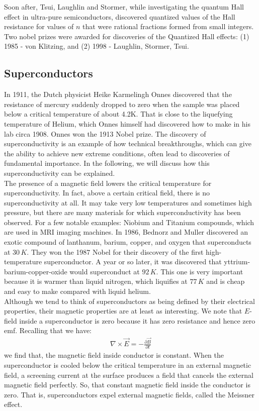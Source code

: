 \documentclass[11pt]{article}
\theoremstyle{break}
\theoremstyle{break}
\newcommand{\pd}{\partial}
\begin{document}
Soon after, Tsui, Laughlin and Stormer, while investigating the quantum Hall effect in ultra-pure semiconductors, discovered quantized values of the Hall resistance for values of $n$ that were rational fractions formed from small integers. \\

Two nobel prizes were awarded for discoveries of the Quantized Hall effects: (1) 1985 - von Klitzing, and (2) 1998 - Laughlin, Stormer, Tsui.



\subsection{Superconductors}
In 1911, the Dutch physicist Heike Karmelingh Onnes discovered that the resistance of mercury suddenly dropped to zero when the sample was placed below a critical temperature of about 4.2K. That is close to the liquefying temperature of Helium, which Onnes himself had discovered how to make in his lab circa 1908. Onnes won the 1913 Nobel prize. The discovery of superconductivity is an example of how technical breakthroughs, which can give the ability to achieve new extreme conditions, often lead to discoveries of fundamental importance. 
In the following, we will discuss how  this superconductivity can be explained.\\

The presence of a magnetic field lowers the critical temperature for superconductivity. In fact, above a certain critical field, there is no superconductivity at all. It may take very low temperatures and sometimes high pressure, but there are many materials for which superconductivity has been observed. For a few notable examples: Niobium and Titanium compounds, which are used in MRI imaging machines. In 1986, Bednorz and Muller discovered an exotic compound of lanthanum, barium, copper, and oxygen that superconducts at $30\,K$.
They won the 1987 Nobel for their discovery of the first high-temperature superconductor. A year or so later, it was discovered that yttrium-barium-copper-oxide would superconduct at $92\, K$. This one is very important because it is warmer than liquid nitrogen, which liquifies at $77\, K$ and is cheap and easy to make compared with liquid helium.\\

Although we tend to think of superconductors as being defined by their electrical properties,
their magnetic properties are at least as interesting. We note that $E$-field inside a superconductor is zero because it has zero resistance and hence zero emf. Recalling that we have:
\begin{align*}
\nabla \times \vec{E} = -\frac{\pd \vec{B}}{\pd t}
\end{align*}
we find that, the magnetic field inside conductor is constant. When the  superconductor is cooled below the critical temperature in an external magnetic field, a screening current at the surface produces a field that cancels the external magnetic field perfectly. So, that constant magnetic field inside the conductor is zero. That is, superconductors expel external magnetic fields, called the Meissner effect.\\
\end{document}
